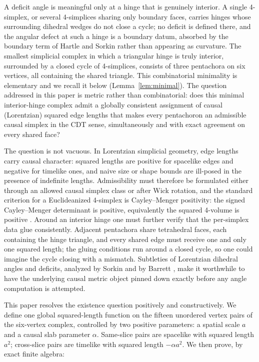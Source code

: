 \documentclass[11pt]{article}
\theoremstyle{definition}
\theoremstyle{remark}
\begin{document}
A deficit angle is meaningful only at a hinge that is genuinely interior. A single 4-simplex, or several 4-simplices sharing only boundary faces, carries hinges whose surrounding dihedral wedges do not close a cycle; no deficit is defined there, and the angular defect at such a hinge is a boundary datum, absorbed by the boundary term of Hartle and Sorkin \cite{HartleSorkin} rather than appearing as curvature. The smallest simplicial complex in which a triangular hinge is truly interior, surrounded by a closed cycle of 4-simplices, consists of three pentachora on six vertices, all containing the shared triangle. This combinatorial minimality is elementary and we recall it below (Lemma~\ref{lem:minimal}). The question addressed in this paper is metric rather than combinatorial: does this minimal interior-hinge complex admit a globally consistent assignment of causal (Lorentzian) squared edge lengths that makes every pentachoron an admissible causal simplex in the CDT sense, simultaneously and with exact agreement on every shared face?

The question is not vacuous. In Lorentzian simplicial geometry, edge lengths carry causal character: squared lengths are positive for spacelike edges and negative for timelike ones, and naive size or shape bounds are ill-posed in the presence of indefinite lengths. Admissibility must therefore be formulated either through an allowed causal simplex class or after Wick rotation, and the standard criterion for a Euclideanized 4-simplex is Cayley--Menger positivity: the signed Cayley--Menger determinant is positive, equivalently the squared 4-volume is positive \cite{Menger,Blumenthal,Berger}. Around an interior hinge one must further verify that the per-simplex data glue consistently. Adjacent pentachora share tetrahedral faces, each containing the hinge triangle, and every shared edge must receive one and only one squared length; the gluing conditions run around a closed cycle, so one could imagine the cycle closing with a mismatch. Subtleties of Lorentzian dihedral angles and deficits, analyzed by Sorkin and by Barrett \cite{Sorkin1975,SorkinAngles,Barrett,BarrettFoxon}, make it worthwhile to have the underlying causal metric object pinned down exactly before any angle computation is attempted.

This paper resolves the existence question positively and constructively. We define one global squared-length function on the fifteen unordered vertex pairs of the six-vertex complex, controlled by two positive parameters: a spatial scale $a$ and a causal slab parameter $\alpha$. Same-slice pairs are spacelike with squared length $a^{2}$; cross-slice pairs are timelike with squared length $-\alpha a^{2}$. We then prove, by exact finite algebra:
\end{document}
